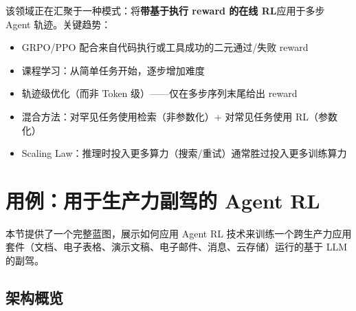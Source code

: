\begin{intuitionbox}[未来：RL + Agent]
该领域正在汇聚于一种模式：将\textbf{带基于执行 reward 的在线 RL}应用于多步 Agent 轨迹。关键趋势：

\begin{itemize}
  \item GRPO/PPO 配合来自代码执行或工具成功的二元通过/失败 reward
  \item 课程学习：从简单任务开始，逐步增加难度
  \item 轨迹级优化（而非 Token 级）——仅在多步序列末尾给出 reward
  \item 混合方法：对罕见任务使用检索（非参数化）+ 对常见任务使用 RL（参数化）
  \item Scaling Law：推理时投入更多算力（搜索/重试）通常胜过投入更多训练算力
\end{itemize}
\end{intuitionbox}

\newpage
\section{用例：用于生产力副驾的 Agent RL}
\label{use-case-agentic-rl-for-a-productivity-co-pilot}

本节提供了一个完整蓝图，展示如何应用 Agent RL 技术来训练一个跨生产力应用套件（文档、电子表格、演示文稿、电子邮件、消息、云存储）运行的基于 LLM 的副驾。

\subsection{架构概览}
\label{architecture-overview-dup2}


